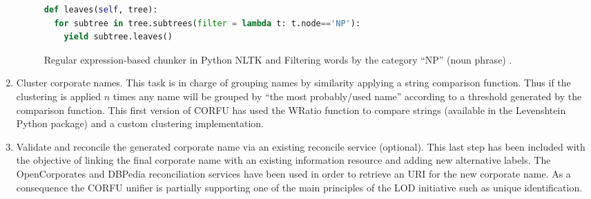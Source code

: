 \documentclass[1p,12pt]{elsarticle}
\begin{document}
\begin{enumerate}
\begin{figure}[!h]
\begin{center}
\begin{lstlisting}[language=Python]
def leaves(self, tree):
  for subtree in tree.subtrees(filter = lambda t: t.node=='NP'):
    yield subtree.leaves()
\end{lstlisting}
\caption{Regular expression-based chunker in Python NLTK and Filtering words by the category ``NP'' (noun phrase) .}
\label{figure:step-4}
\end{center}
\end{figure}   

\item Cluster corporate names. This task is in charge of grouping names by similarity applying 
a string comparison function. Thus if the clustering is applied $n$ times any name 
will be grouped by ``the most probably/used name'' according to a threshold generated 
by the comparison function. This first version of CORFU has used the WRatio function to 
compare strings (available in the Levenshtein Python package) and a custom clustering 
implementation.

\item Validate and reconcile the generated corporate name via an existing reconcile service (optional). This last 
step has been included with the objective of linking the final corporate name with an existing information 
resource and adding new alternative labels. The OpenCorporates and DBPedia reconciliation services have 
been used in order to retrieve an URI for the new corporate name. As a consequence the CORFU unifier is partially supporting 
one of the main principles of the LOD initiative such as unique identification.
\end{enumerate}
% 
%
\end{document}
